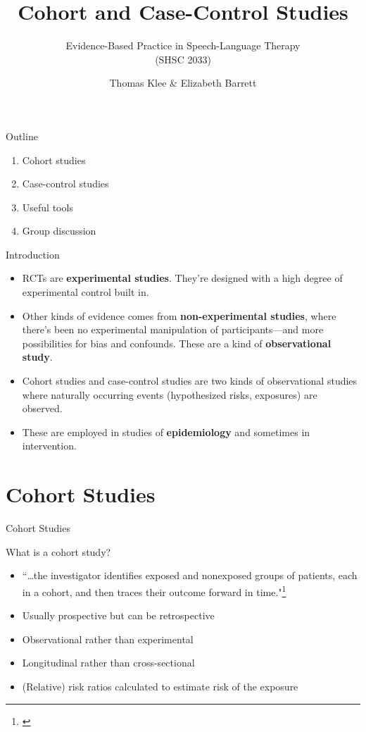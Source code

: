 \documentclass{beamer}
\title{Cohort and Case-Control Studies}
\subtitle{}
\author{Evidence-Based Practice in Speech-Language Therapy \\ (SHSC 2033)}
\institute{Session 5}
\date{Thomas Klee \& Elizabeth Barrett}
\begin{document}
\begin{frame}
	\titlepage
\end{frame}

\begin{frame}{Outline}
	\begin{enumerate}
	\item Cohort studies
	\item Case-control studies
	\item Useful tools
	\item Group discussion
	\end {enumerate}
\end{frame}

\begin{frame}{Introduction}
	\begin{itemize}
	\item RCTs are \textbf{experimental studies}. They're designed with a high degree of experimental control built in. 
	\item Other kinds of evidence comes from \textbf{non-experimental studies}, where there's been no experimental manipulation of participants---and more possibilities for bias and confounds. These are a kind of \textbf{observational study}.
	\item Cohort studies and case-control studies are two kinds of observational studies where naturally occurring events (hypothesized risks, exposures) are observed.
	\item These are employed in studies of \textbf{epidemiology} and sometimes in intervention.
	\end {itemize}
\end{frame}

\section{Cohort Studies}

\begin{frame}
\begin{center}
\Huge{Cohort Studies}
\end{center}
\end{frame}

\begin{frame}{What is a cohort study?}
	\begin{itemize}
	\item ``\dots the investigator identifies exposed and nonexposed groups of patients, each in a cohort, and then traces their outcome forward in time."\footnote{\tiny{\citet[p. 147]{Guyatt2008d}}}
	\item Usually prospective but can be retrospective
	\item Observational rather than experimental
	\item Longitudinal rather than cross-sectional
	\item (Relative) risk ratios calculated to estimate risk of the exposure
	\end{itemize}
\end{frame}
\end{document}
